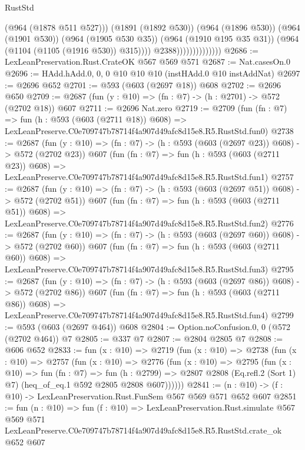 \begin{lexlean}{RustStd}
\begin{coremodule}
                                      (@964 (@1878 @511 @527)))
                                    (@1891 (@1892 @530))
                                    (@964 (@1896 @530))
                                    (@964 (@1901 @530))
                                    (@964 (@1905 @530 @35))
                                    (@964 (@1910 @195 @35 @31))
                                    (@964 (@1104 (@1105 (@1916 @530)) @315))))
                                @2388))))))))))))))
@2686 := LexLeanPreservation.Rust.CrateOK @567 @569 @571
@2687 := Nat.casesOn.{0}
@2696 := HAdd.hAdd.{0, 0, 0} @10 @10 @10 (instHAdd.{0} @10 instAddNat)
@2697 := @2696 @652
@2701 := @593 (@603 (@2697 @18)) @608
@2702 := @2696 @650
@2709 := @2687 (fun (y : @10) => (fn : @7) -> (h : @2701) -> @572 (@2702 @18)) @607
@2711 := @2696 Nat.zero
@2719 := @2709
    (fun (fn : @7) =>
    fun (h : @593 (@603 (@2711 @18)) @608) =>
    LexLeanPreserve.C0e709747b78714f4a907d49afc8d15e8.R5.RustStd.fun0)
@2738 := @2687
    (fun (y : @10) => (fn : @7) -> (h : @593 (@603 (@2697 @23)) @608) -> @572 (@2702 @23))
    @607
    (fun (fn : @7) =>
    fun (h : @593 (@603 (@2711 @23)) @608) =>
    LexLeanPreserve.C0e709747b78714f4a907d49afc8d15e8.R5.RustStd.fun1)
@2757 := @2687
    (fun (y : @10) => (fn : @7) -> (h : @593 (@603 (@2697 @51)) @608) -> @572 (@2702 @51))
    @607
    (fun (fn : @7) =>
    fun (h : @593 (@603 (@2711 @51)) @608) =>
    LexLeanPreserve.C0e709747b78714f4a907d49afc8d15e8.R5.RustStd.fun2)
@2776 := @2687
    (fun (y : @10) => (fn : @7) -> (h : @593 (@603 (@2697 @60)) @608) -> @572 (@2702 @60))
    @607
    (fun (fn : @7) =>
    fun (h : @593 (@603 (@2711 @60)) @608) =>
    LexLeanPreserve.C0e709747b78714f4a907d49afc8d15e8.R5.RustStd.fun3)
@2795 := @2687
    (fun (y : @10) => (fn : @7) -> (h : @593 (@603 (@2697 @86)) @608) -> @572 (@2702 @86))
    @607
    (fun (fn : @7) =>
    fun (h : @593 (@603 (@2711 @86)) @608) =>
    LexLeanPreserve.C0e709747b78714f4a907d49afc8d15e8.R5.RustStd.fun4)
@2799 := @593 (@603 (@2697 @464)) @608
@2804 := Option.noConfusion.{0, 0} (@572 (@2702 @464)) @7
@2805 := @337 @7
@2807 := @2804 @2805 @7
@2808 := @606 @652
@2833 := fun (x : @10) =>
  @2719
    (fun (x : @10) =>
    @2738
      (fun (x : @10) =>
      @2757
        (fun (x : @10) =>
        @2776
          (fun (x : @10) =>
          @2795
            (fun (x : @10) =>
            fun (fn : @7) =>
            fun (h : @2799) =>
            @2807 @2808 (Eq.refl.{2} (Sort 1) @7) (heq_of_eq.{1} @592 @2805 @2808 @607))))))
@2841 := (n : @10) -> (f : @10) -> LexLeanPreservation.Rust.FunSem @567 @569 @571 @652 @607
@2851 := fun (n : @10) =>
  fun (f : @10) =>
  LexLeanPreservation.Rust.simulate
    @567
    @569
    @571
    LexLeanPreserve.C0e709747b78714f4a907d49afc8d15e8.R5.RustStd.crate_ok
    @652
    @607
\end{coremodule}
\end{lexlean}
